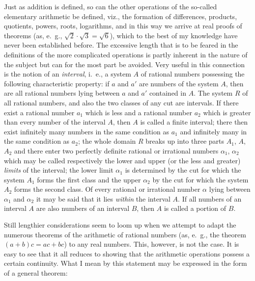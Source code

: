 \documentclass[oneside]{book}
\begin{document}
Just as addition is defined, so can the other operations
of the so-called elementary arithmetic be defined,
viz., the formation of differences, products,
quotients, powers, roots, logarithms, and in this way
we arrive at real proofs of theorems (as, e.~g., $\sqrt{2}\cdot\sqrt{3}
=\sqrt{6}$), which to the best of my knowledge have never
been established before. The excessive length that is
to be feared in the definitions of the more complicated
operations is partly inherent in the nature of the subject
but can for the most part be avoided. Very useful in
this connection is the notion of an \textit{interval}, i.~e., a
system $A$ of rational numbers possessing the following
characteristic property: if $a$ and $a'$ are numbers
of the system $A$, then are all rational numbers lying
between $a$ and $a'$ contained in $A$. The system $R$ of
all rational numbers, and also the two classes of any
cut are intervals. If there exist a rational number $a_1$
which is less and a rational number $a_2$ which is greater
than every number of the interval $A$, then $A$ is called
a finite interval; there then exist infinitely many numbers
in the same condition as $a_1$ and infinitely many in
the same condition as $a_2$; the whole domain $R$ breaks
up into three parts $A_1$, $A$, $A_2$ and there enter two perfectly
definite rational or irrational numbers $\alpha_1$, $\alpha_2$
which may be called respectively the lower and upper
(or the less and greater) \textit{limits} of the interval; the
lower limit $\alpha_1$ is determined by the cut for which the
system $A_1$ forms the first class and the upper $\alpha_2$ by the
cut for which the system $A_2$ forms the second class.
Of every rational or irrational number $\alpha$ lying between
$\alpha_1$ and $\alpha_2$ it may be said that it lies \textit{within} the interval
$A$. If all numbers of an interval $A$ are also numbers
of an interval $B$, then $A$ is called a portion of $B$.

Still lengthier considerations seem to loom up
when we attempt to adapt the numerous theorems of
the arithmetic of rational numbers (as, e.~g., the theorem
$(a+b)c=ac+bc$) to any real numbers. This,
however, is not the case. It is easy to see that it
all reduces to showing that the arithmetic operations
possess a certain continuity. What I mean by this
statement may be expressed in the form of a general
theorem:
\end{document}
